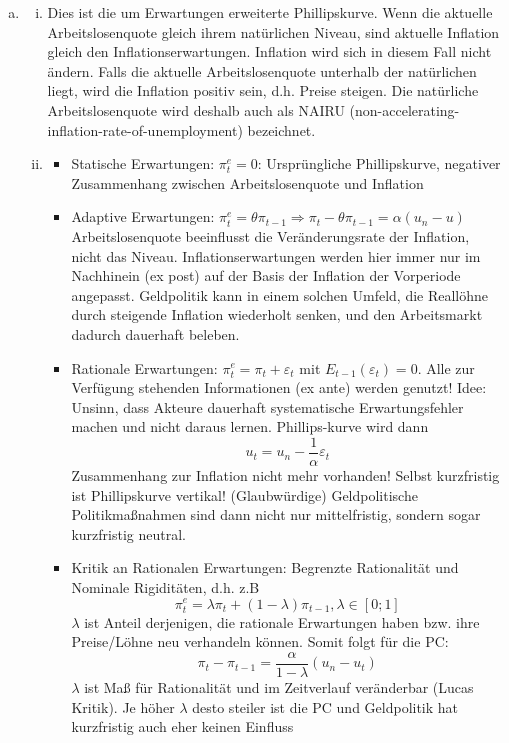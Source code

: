 \documentclass{scrartcl}
\begin{document}
\begin{enumerate}[a)]
  \item
  \begin{enumerate}[(i)]
    \item Dies ist die um Erwartungen erweiterte Phillipskurve. Wenn die aktuelle Arbeitslosenquote gleich ihrem nat\"{u}rlichen Niveau, sind aktuelle Inflation gleich den Inflationserwartungen. Inflation wird sich in diesem Fall nicht \"{a}ndern. Falls die aktuelle Arbeitslosenquote unterhalb der nat\"{u}rlichen liegt, wird die Inflation positiv sein, d.h. Preise steigen. Die nat\"{u}rliche Arbeitslosenquote wird deshalb auch als NAIRU (non-accelerating-inflation-rate-of-unemployment) bezeichnet.
    \item \begin{itemize}
      \item Statische Erwartungen: $\pi_t^e = 0$: Urspr\"{u}ngliche Phillipskurve, negativer Zusammenhang zwischen Arbeitslosenquote und Inflation
      \item Adaptive Erwartungen: $\pi_t^e = \theta \pi_{t-1} \Rightarrow \pi_t - \theta \pi_{t-1} = \alpha(u_n-u)$ Arbeitslosenquote beeinflusst die Ver\"{a}nderungsrate der Inflation, nicht das Niveau. Inflationserwartungen werden hier immer nur im Nachhinein (ex post) auf der Basis der Inflation der Vorperiode angepasst. Geldpolitik kann in einem solchen Umfeld, die Reall\"{o}hne durch steigende Inflation wiederholt senken, und den Arbeitsmarkt dadurch dauerhaft beleben.
      \item Rationale Erwartungen: $\pi_t^e = \pi_t + \varepsilon_t$ mit $E_{t-1}(\varepsilon_t)=0$. Alle zur Verf\"{u}gung stehenden Informationen (ex ante) werden genutzt!
      Idee: Unsinn, dass Akteure dauerhaft systematische Erwartungsfehler machen und nicht daraus lernen. Phillips-kurve wird dann
      $$ u_t = u_n - \frac{1}{\alpha} \varepsilon_t$$
      Zusammenhang zur Inflation nicht mehr vorhanden! Selbst kurzfristig ist Phillipskurve vertikal! (Glaubw\"{u}rdige) Geldpolitische Politikma{\ss}nahmen sind dann nicht nur mittelfristig,
      sondern sogar kurzfristig neutral.
      \item Kritik an Rationalen Erwartungen: Begrenzte Rationalit\"{a}t und Nominale Rigidit\"{a}ten, d.h. z.B
      $$ \pi_t^e = \lambda \pi_t + (1-\lambda) \pi_{t-1}, \lambda \in [0;1]$$
      $\lambda$ ist Anteil derjenigen, die rationale Erwartungen haben bzw. ihre Preise/L\"{o}hne neu verhandeln k\"{o}nnen. Somit folgt f\"{u}r die PC:
      $$ \pi_t - \pi_{t-1} = \frac{\alpha}{1-\lambda}(u_n-u_t)$$
      $\lambda$ ist Ma{\ss} f\"{u}r Rationalit\"{a}t und im Zeitverlauf ver\"{a}nderbar (Lucas Kritik). Je h\"{o}her $\lambda$ desto steiler ist die PC und Geldpolitik hat kurzfristig auch eher keinen Einfluss
    \end{itemize}
  \end{enumerate}
\end{enumerate}
\end{document}
